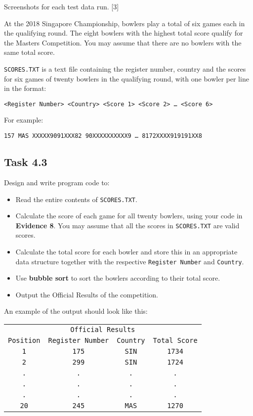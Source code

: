 Screenshots for each test data run. {[}3{]}\quad{} 

At the 2018 Singapore Championship, bowlers play a total of six games
each in the qualifying round. The eight bowlers with the highest total
score qualify for the Masters Competition. You may assume that there
are no bowlers with the same total score.

\texttt{SCORES.TXT} is a text file containing the register number,
country and the scores for six games of twenty bowlers in the qualifying
round, with one bowler per line in the format: 
\noindent \begin{center}
\texttt{<Register Number> <Country> <Score 1> <Score 2> \dots{} <Score
6>}
\par\end{center}

For example: 
\noindent \begin{center}
\texttt{157 MAS XXXXX9091XXX82 90XXXXXXXXXX9 \dots{} 8172XXXX919191XX8}
\par\end{center}

\subsection*{Task 4.3 }

Design and write program code to:
\begin{itemize}
\item Read the entire contents of \texttt{SCORES.TXT}. 
\item Calculate the score of each game for all twenty bowlers, using your
code in \textbf{Evidence 8}. You may assume that all the scores in
\texttt{SCORES.TXT} are valid scores.
\item Calculate the total score for each bowler and store this in an appropriate
data structure together with the respective \texttt{Register Number}
and \texttt{Country}. 
\item Use \textbf{bubble sort} to sort the bowlers according to their total
score. 
\item Output the Official Results of the competition.
\end{itemize}
An example of the output should look like this:
\noindent \begin{center}
\begin{tabular}{cccc}
\multicolumn{4}{c}{\texttt{Official Results}}\tabularnewline
\texttt{Position} & \texttt{Register Number} & \texttt{Country} & \texttt{Total Score}\tabularnewline
\texttt{1} & \texttt{175} & \texttt{SIN} & \texttt{1734}\tabularnewline
\texttt{2} & \texttt{299} & \texttt{SIN} & \texttt{1724}\tabularnewline
\texttt{.} & \texttt{.} & \texttt{.} & \texttt{.}\tabularnewline
\texttt{.} & \texttt{.} & \texttt{.} & \texttt{.}\tabularnewline
\texttt{.} & \texttt{.} & \texttt{.} & \texttt{.}\tabularnewline
\texttt{20} & \texttt{245} & \texttt{MAS} & \texttt{1270}\tabularnewline
\end{tabular}
\par\end{center}

